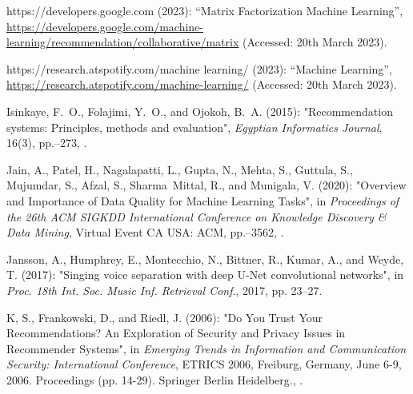 \documentclass[11pt,titlepage,oneside]{book}
\begin{document}
\begin{thebibliography}{97}
	https://developers.google.com (2023): \enquote{Matrix {Factorization}
		{\textbar} {Machine} {Learning}},
	\urlprefix\url{https://developers.google.com/machine-learning/recommendation/collaborative/matrix} (Accessed: 20th March 2023).
	
	https://research.atspotify.com/machine learning/ (2023): \enquote{Machine
		{Learning}},
	\urlprefix\url{https://research.atspotify.com/machine-learning/} (Accessed: 20th March 2023).
	
	Isinkaye, F.~O., Folajimi, Y.~O., and Ojokoh, B.~A. (2015):
	"Recommendation systems: {Principles}, methods and evaluation",
	\textit{Egyptian Informatics Journal}, 16(3), pp.--273,
	.
	
	Jain, A., Patel, H., Nagalapatti, L., Gupta, N., Mehta, S., Guttula, S.,
	Mujumdar, S., Afzal, S., Sharma~Mittal, R., and Munigala, V. (2020):
	"Overview and {Importance} of {Data} {Quality} for {Machine}
		{Learning} {Tasks}", in \textit{Proceedings of the 26th {ACM} {SIGKDD}
		{International} {Conference} on {Knowledge} {Discovery} \& {Data} {Mining}},
	Virtual Event CA USA: ACM, pp.--3562,
	.
	
	Jansson, A., Humphrey, E., Montecchio, N., Bittner, R., Kumar, A., and Weyde,
	T. (2017): "Singing voice separation with deep {U}-{Net}
		convolutional networks", in \textit{Proc. 18th Int. Soc. Music Inf. Retrieval Conf}., 2017,
		pp. 23–27.
	
	K, S., Frankowski, D., and Riedl, J. (2006): "Do {You} {Trust} {Your}
		{Recommendations}? {An} {Exploration} of {Security} and {Privacy} {Issues} in
		{Recommender} {Systems}", in \textit{Emerging Trends in Information and Communication Security: International Conference}, ETRICS 2006, Freiburg, Germany, June 6-9, 2006. Proceedings (pp. 14-29). Springer Berlin Heidelberg.,
	.
	

\end{thebibliography}
\end{document}

